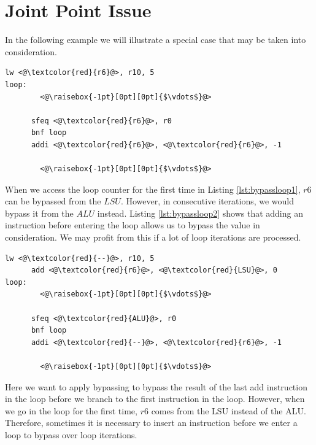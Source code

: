 

\section{Joint Point Issue}
In the following example we will illustrate a special case that may be taken into consideration.

\begin{lstlisting}[caption=Example code fragment where bypassing over backedge of a loop iteration is not possible., label=lst:bypassloop1]
      lw <@\textcolor{red}{r6}@>, r10, 5
loop: 
        <@\raisebox{-1pt}[0pt][0pt]{$\vdots$}@>
      
      sfeq <@\textcolor{red}{r6}@>, r0
      bnf loop
      addi <@\textcolor{red}{r6}@>, <@\textcolor{red}{r6}@>, -1

        <@\raisebox{-1pt}[0pt][0pt]{$\vdots$}@>
\end{lstlisting}

When we access the loop counter for the first time in Listing \ref{lst:bypassloop1}, $r6$ can be bypassed from the $LSU$. However, in consecutive iterations, we would bypass it from the $ALU$ instead. Listing \ref{lst:bypassloop2} shows that adding an instruction before entering the loop allows us to bypass the value in consideration. We may profit from this if a lot of loop iterations are processed.

\begin{lstlisting}[caption=Example code fragment where bypassing over the backedge of a loop iteration is possible., label=lst:bypassloop2]
      lw <@\textcolor{red}{--}@>, r10, 5
      add <@\textcolor{red}{r6}@>, <@\textcolor{red}{LSU}@>, 0
loop: 
        <@\raisebox{-1pt}[0pt][0pt]{$\vdots$}@>
      
      sfeq <@\textcolor{red}{ALU}@>, r0
      bnf loop
      addi <@\textcolor{red}{--}@>, <@\textcolor{red}{r6}@>, -1

        <@\raisebox{-1pt}[0pt][0pt]{$\vdots$}@>
\end{lstlisting}

Here we want to apply bypassing to bypass the result of the last add instruction in the loop before we branch to the first instruction in the loop. However, when we go in the loop for the first time, $r6$ comes from the LSU instead of the ALU. Therefore, sometimes it is necessary to insert an instruction before we enter a loop to bypass over loop iterations.

